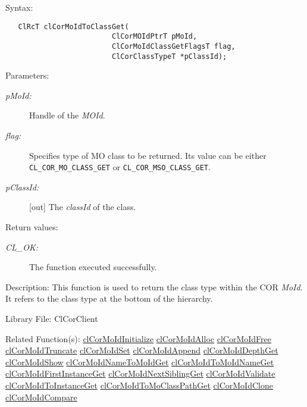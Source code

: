 \begin{Desc}
\item[Syntax:]

\footnotesize\begin{verbatim}   ClRcT clCorMoIdToClassGet(
                         ClCorMOIdPtrT pMoId, 
                         ClCorMoIdClassGetFlagsT flag,
                         ClCorClassTypeT *pClassId);
\end{verbatim}
\normalsize
\end{Desc}
\begin{Desc}
\item[Parameters:]
\begin{description}
\item[{\em p\-Mo\-Id:}]Handle of the {\em MOId\/}. \item[{\em flag:}]Specifies type of MO class to be returned. Its value can be either {\tt CL\_\-COR\_\-MO\_\-CLASS\_\-GET} or {\tt CL\_\-COR\_\-MSO\_\-CLASS\_\-GET}. \item[{\em p\-Class\-Id:}]\mbox{[}out\mbox{]} The {\em class\-Id\/} of the class.\end{description}
\end{Desc}
\begin{Desc}
\item[Return values:]
\begin{description}
\item[{\em CL\_\-OK:}]The function executed successfully.\end{description}
\end{Desc}
\begin{Desc}
\item[Description:]This function is used to return the class type within the COR {\em Mo\-Id\/}. It refers to the class type at the bottom of the hierarchy.\end{Desc}
\begin{Desc}
\item[Library File:]Cl\-Cor\-Client\end{Desc}
\begin{Desc}
\item[Related Function(s):]\hyperlink{group__group13}{cl\-Cor\-Mo\-Id\-Initialize} \hyperlink{group__group13}{cl\-Cor\-Mo\-Id\-Alloc} \hyperlink{group__group13}{cl\-Cor\-Mo\-Id\-Free} \hyperlink{group__group13}{cl\-Cor\-Mo\-Id\-Truncate} \hyperlink{group__group13}{cl\-Cor\-Mo\-Id\-Set} \hyperlink{group__group13}{cl\-Cor\-Mo\-Id\-Append} \hyperlink{group__group13}{cl\-Cor\-Mo\-Id\-Depth\-Get} \hyperlink{group__group13}{cl\-Cor\-Mo\-Id\-Show} \hyperlink{group__group13}{cl\-Cor\-Mo\-Id\-Name\-To\-Mo\-Id\-Get} \hyperlink{group__group13}{cl\-Cor\-Mo\-Id\-To\-Mo\-Id\-Name\-Get} \hyperlink{group__group13}{cl\-Cor\-Mo\-Id\-First\-Instance\-Get} \hyperlink{group__group13}{cl\-Cor\-Mo\-Id\-Next\-Sibling\-Get} \hyperlink{group__group13}{cl\-Cor\-Mo\-Id\-Validate} \hyperlink{group__group13}{cl\-Cor\-Mo\-Id\-To\-Instance\-Get} \hyperlink{group__group13}{cl\-Cor\-Mo\-Id\-To\-Mo\-Class\-Path\-Get} \hyperlink{group__group13}{cl\-Cor\-Mo\-Id\-Clone} \hyperlink{group__group13}{cl\-Cor\-Mo\-Id\-Compare} \end{Desc}

